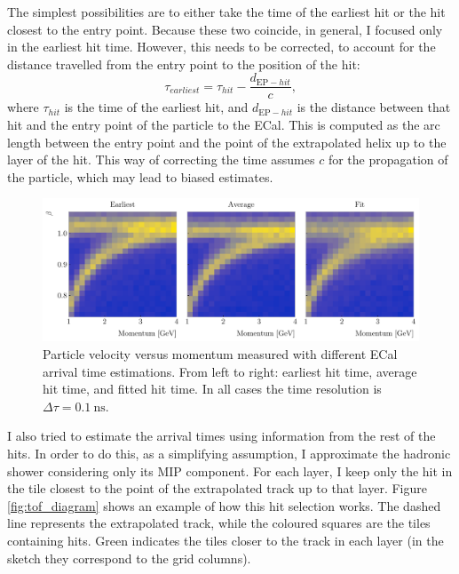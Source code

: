 The simplest possibilities are to either take the time of the earliest hit or the hit closest to the entry point. Because these two coincide, in general, I focused only in the earliest hit time. However, this needs to be corrected, to account for the distance travelled from the entry point to the position of the hit:
\begin{equation}\label{8.22}
	\tau_{earliest} = \tau_{hit} - \frac{d_{\mathrm{EP}-hit}}{c},
\end{equation}
where $\tau_{hit}$ is the time of the earliest hit, and $d_{\mathrm{EP}-hit}$ is the distance between that hit and the entry point of the particle to the ECal. This is computed as the arc length between the entry point and the point of the extrapolated helix up to the layer of the hit. This way of correcting the time assumes $c$ for the propagation of the particle, which may lead to biased estimates.

\begin{figure}[t]
	\centering
	\includegraphics[width=.99\linewidth]{Images/GArSoft_PID/tof/beta_vs_momentum_comparison_delta_0.1.pdf}
	\caption{Particle velocity versus momentum measured with different ECal arrival time estimations. From left to right: earliest hit time, average hit time, and fitted hit time. In all cases the time resolution is $\Delta \tau = 0.1 ~ \mathrm{ns}$.}
	\label{fig:tof_beta_comp}
\end{figure}

I also tried to estimate the arrival times using information from the rest of the hits. In order to do this, as a simplifying assumption, I approximate the hadronic shower considering only its MIP component. For each layer, I keep only the hit in the tile closest to the point of the extrapolated track up to that layer. Figure \ref{fig:tof_diagram} shows an example of how this hit selection works. The dashed line represents the extrapolated track, while the coloured squares are the tiles containing hits. Green indicates the tiles closer to the track in each layer (in the sketch they correspond to the grid columns).

